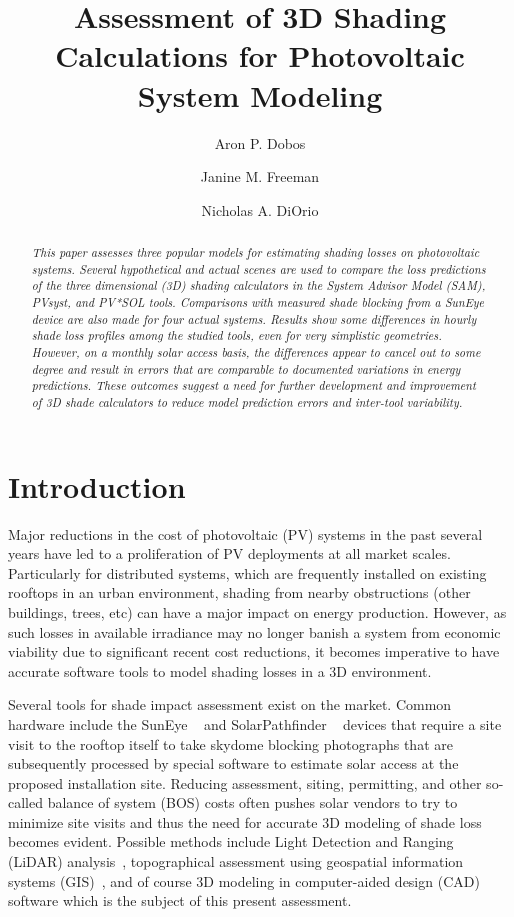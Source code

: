 \documentclass[twocolumn,10pt]{asme2ej}
\title{Assessment of 3D Shading Calculations for Photovoltaic System Modeling}
\author{Aron P. Dobos
    \affiliation{
	Senior Engineer, NREL\\
	aron.dobos@nrel.gov
    }	
}
\author{Janine M. Freeman
    \affiliation{
	Energy Modeling Engineer, NREL\\
	janine.freeman@nrel.gov
    }	
}
\author{Nicholas A. DiOrio
    \affiliation{
	Modeling and Software Engineer, NREL\\
	nicholas.diorio@nrel.gov
    }	
}
\begin{document}
\maketitle    

\begin{abstract}
{\it 
This paper assesses three popular models for estimating shading losses on photovoltaic systems.  Several hypothetical and actual scenes are used to compare the loss predictions of the three dimensional (3D) shading calculators in the System Advisor Model (SAM), PVsyst, and PV*SOL tools.   Comparisons with measured shade blocking from a SunEye device are also made for four actual systems.  Results show some  differences in hourly shade loss profiles among the studied tools, even for very simplistic geometries.  However, on a monthly solar access basis, the differences appear to cancel out to some degree and result in errors that are comparable to documented variations in energy predictions.   These outcomes suggest a need for further development and improvement of 3D shade calculators to reduce model prediction errors and inter-tool variability.
}
\end{abstract}

\section{Introduction}

Major reductions in the cost of photovoltaic (PV) systems in the past several years have led to a proliferation of PV deployments at all market scales.  Particularly for distributed systems, which are frequently installed on existing rooftops in an urban environment, shading from nearby obstructions (other buildings, trees, etc) can have a major impact on energy production.  However, as such losses in available irradiance may no longer banish a system from economic viability due to significant recent cost reductions, it becomes imperative to have accurate software tools to model shading losses in a 3D environment.  

Several tools for shade impact assessment exist on the market.  Common hardware include the SunEye ~\cite{suneye} and SolarPathfinder ~\cite{solarpathfinder} devices that require a site visit to the rooftop itself to take skydome blocking photographs that are subsequently processed by special software to estimate solar access at the proposed installation site.  Reducing assessment, siting, permitting, and other so-called balance of system (BOS) costs often pushes solar vendors to try to minimize site visits and thus the need for accurate 3D modeling of shade loss becomes evident.  Possible methods include Light Detection and Ranging (LiDAR) analysis~\cite{jakubiec2013}, topographical assessment using geospatial information systems (GIS)~\cite{melius2013}, and of course 3D modeling in computer-aided design (CAD) software which is the subject of this present assessment.
\end{document}
